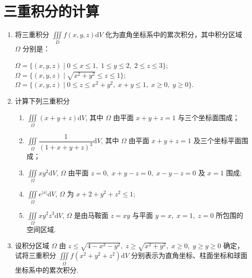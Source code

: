 \section{三重积分的计算}

\begin{enumerate}\setlength{\itemsep}{7pt}
    \item 将三重积分 $\displaystyle\iiint\limits_{D}f(x, y, z)\text{d}V$ 化为直角坐标系中的累次积分，其中积分区域 $\Omega$ 分别是：
    \begin{enumerate}[(1)]\setlength{\itemsep}{5pt}\setlength{\topsep}{15pt}
        $\displaystyle\Omega=\{(x, y, z) \mid 0\leqslant x \leqslant 1,\;1\leqslant y\leqslant 2,\;2\leqslant z\leqslant 3\}$;
        $\displaystyle\Omega=\{(x, y, z) \mid \sqrt{x^2+y^2}\leqslant z\leqslant 1\}$;
        $\displaystyle\Omega=\{(x, y, z) \mid 0\leqslant z\leqslant x^2+y^2,\;x+y\leqslant 1,\;x\geqslant 0,\;y\geqslant 0\}$.
    \end{enumerate}

    \item 计算下列三重积分
    \begin{enumerate}[(1)]\setlength{\itemsep}{5pt}\setlength{\topsep}{15pt}
        \item $\displaystyle\iiint\limits_{\Omega}(x+y+z)\text{d}V$, 其中 $\Omega$ 由平面 $x+y+z=1$ 与三个坐标面围成；
        \item $\displaystyle\iiint\limits_{\Omega}\dfrac{1}{(1+x+y+z)^3}\text{d}V$, 其中 $\Omega$ 由平面 $x+y+z=1$ 及三个坐标平面围成；
        \item $\displaystyle\iiint\limits_{\Omega}xy^2\text{d}V$, $\Omega$ 由平面 $z=0,\;x+y-z=0,\;x-y-z=0$ 及 $x=1$ 围成;
        \item $\displaystyle\iiint\limits_{\Omega}e^{|x|}\text{d}V$, $\Omega$ 为 $x+2+y^2+z^2\leqslant 1$;
        \item $\displaystyle\iiint\limits_{\Omega}xy^2z^3\text{d}V$, $\Omega$ 是由马鞍面 $z=xy$ 与平面 $y=x,\;x=1,\;z=0$ 所包围的空间区域.    
    \end{enumerate}

    \item 设积分区域 $\Omega$ 由 $z\leqslant \sqrt{4-x^2-y^2},\;z\geqslant\sqrt{x^2+y^2},\;x\geqslant 0,\;y\geqslant y\geqslant 0$ 确定，试将三重积分 $\displaystyle\iiint\limits_{\Omega}f(x^2+y^2+z^2)\text{d}V$ 分别表示为直角坐标、柱面坐标和球面坐标系中的累次积分.
    

\end{enumerate}
